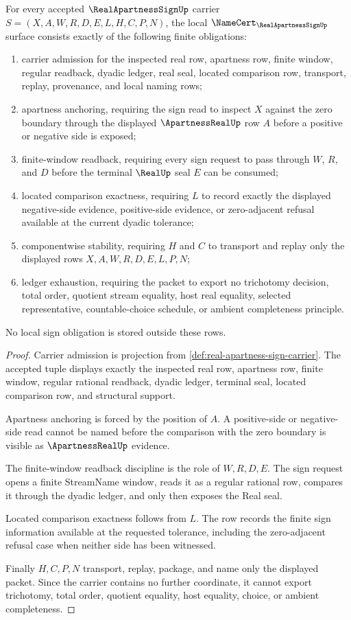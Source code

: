 \begin{theorem}
\label{thm:real-apartness-sign-namecert-obligations}
For every accepted $\RealApartnessSignUp$ carrier $S=(X,A,W,R,D,E,L,H,C,P,N)$, the local $\NameCert_{\RealApartnessSignUp}$ surface consists exactly of the following finite obligations:
\begin{enumerate}
\item carrier admission for the inspected real row, apartness row, finite window, regular readback, dyadic ledger, real seal, located comparison row, transport, replay, provenance, and local naming rows;
\item apartness anchoring, requiring the sign read to inspect $X$ against the zero boundary through the displayed $\ApartnessRealUp$ row $A$ before a positive or negative side is exposed;
\item finite-window readback, requiring every sign request to pass through $W$, $R$, and $D$ before the terminal $\RealUp$ seal $E$ can be consumed;
\item located comparison exactness, requiring $L$ to record exactly the displayed negative-side evidence, positive-side evidence, or zero-adjacent refusal available at the current dyadic tolerance;
\item componentwise stability, requiring $H$ and $C$ to transport and replay only the displayed rows $X,A,W,R,D,E,L,P,N$;
\item ledger exhaustion, requiring the packet to export no trichotomy decision, total order, quotient stream equality, host real equality, selected representative, countable-choice schedule, or ambient completeness principle.
\end{enumerate}
No local sign obligation is stored outside these rows.
\end{theorem}
\begin{proof}
Carrier admission is projection from \autoref{def:real-apartness-sign-carrier}. The accepted tuple displays exactly the inspected real row, apartness row, finite window, regular rational readback, dyadic ledger, terminal seal, located comparison row, and structural support.

Apartness anchoring is forced by the position of $A$. A positive-side or negative-side read cannot be named before the comparison with the zero boundary is visible as $\ApartnessRealUp$ evidence.

The finite-window readback discipline is the role of $W,R,D,E$. The sign request opens a finite StreamName window, reads it as a regular rational row, compares it through the dyadic ledger, and only then exposes the Real seal.

Located comparison exactness follows from $L$. The row records the finite sign information available at the requested tolerance, including the zero-adjacent refusal case when neither side has been witnessed.

Finally $H,C,P,N$ transport, replay, package, and name only the displayed packet. Since the carrier contains no further coordinate, it cannot export trichotomy, total order, quotient equality, host equality, choice, or ambient completeness.
\end{proof}

